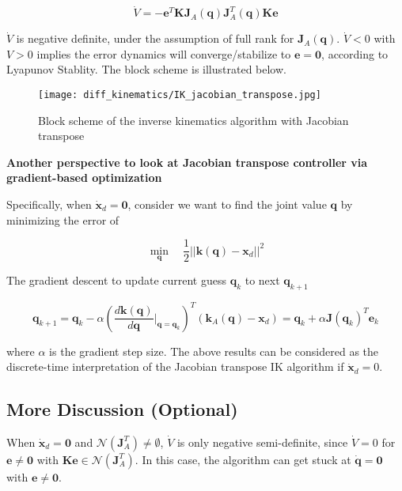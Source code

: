 \documentclass[10pt]{article}
\begin{document}
$$
\dot{V}=-\boldsymbol{e}^{T} \boldsymbol{K} \boldsymbol{J}_{A}(\boldsymbol{q}) \boldsymbol{J}_{A}^{T}(\boldsymbol{q}) \boldsymbol{K} \boldsymbol{e}
$$

 $\dot{V}$ is negative definite, under the assumption of full rank for $\boldsymbol{J}_{A}(\boldsymbol{q})$. $\dot{V}<0$ with $V>0$ implies the error dynamics will converge/stabilize to  $\boldsymbol{e}=\mathbf{0}$, according to Lyapunov Stablity.  The block scheme is illustrated below.

\begin{figure}[H]
    \centering
    \texttt{[image: diff\_kinematics/IK\_jacobian\_transpose.jpg]}
    \caption{Block scheme of the inverse kinematics algorithm with Jacobian transpose}
    \label{l2-2.fig2}
\end{figure}


\begin{shaded}

\textbf{Another perspective to look at  Jacobian transpose controller via gradient-based optimization}

Specifically, when $\dot{\boldsymbol{x}}_d=\boldsymbol{0}$, consider we want to find the joint value $\boldsymbol{q}$ by minimizing the error of 

$$
\min_{\boldsymbol{q}}\quad\frac{1}{2}||\boldsymbol{k}(\boldsymbol{q})-\boldsymbol{x}_d||^2
$$

The gradient descent to update current guess $\boldsymbol{q}_k$ to next $\boldsymbol{q}_{k+1}$

$$
\boldsymbol{q}_{k+1}=\boldsymbol{q}_{k}-\alpha{\left(\frac{d\boldsymbol{k}(\boldsymbol{q})}{d\boldsymbol{q}}\bigg\rvert_{\boldsymbol{q}=\boldsymbol{q}_k}\right)}^{T}(\boldsymbol{k}_{A}(\boldsymbol{q})-\boldsymbol{x}_d)=\boldsymbol{q}_{k}+\alpha{\boldsymbol{J}(\boldsymbol{q}_k)}^{T}\boldsymbol{e}_k
$$

where $\alpha$ is the gradient step size. The above
results can be considered as the discrete-time interpretation of the Jacobian transpose IK algorithm if  $\boldsymbol{\dot{x}}_d=0$.


\end{shaded}


\subsection*{More Discussion (Optional)}

 When  $\dot{\boldsymbol{x}}_{d} = \mathbf{0}$ and  $\mathcal{N}\left(\boldsymbol{J}_{A}^{T}\right) \neq \emptyset$, $\dot{V}$ is only negative semi-definite, since $\dot{V}=0$ for $\boldsymbol{e} \neq \mathbf{0}$ with $\boldsymbol{K} \boldsymbol{e} \in \mathcal{N}\left(\boldsymbol{J}_{A}^{T}\right)$. In this case, the algorithm can get stuck at $\dot{\boldsymbol{q}}=\mathbf{0}$ with $\boldsymbol{e} \neq \mathbf{0}$.
\end{document}
